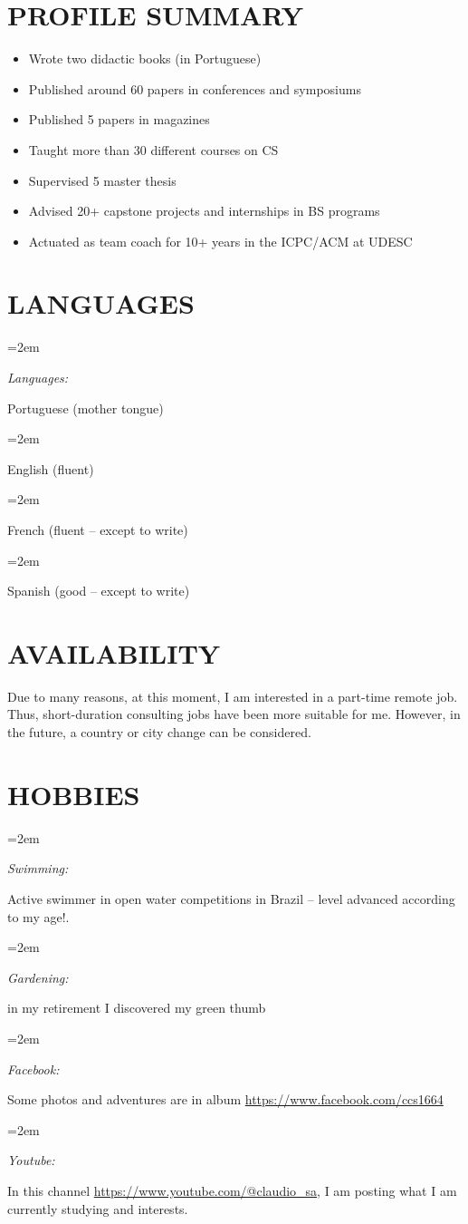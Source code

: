 \documentclass[paper=a4,fontsize=11pt]{scrartcl} %
\newlength{\spacebox}
\newcommand{\sepspace}{\vspace*{0.8em}}		%
\newcommand{\NewPart}[1]{\section*{\uppercase{#1}}}
\newcommand{\PersonalEntry}[2]{
		\noindent\hangindent=2em\hangafter=0 %
		\parbox{\spacebox}{        %
		\textit{#1}}		       %
		\hspace{1.5em} #2 \par}    %
\newcommand{\SkillsEntry}[2]{      %
		\noindent\hangindent=2em\hangafter=0 %
		\parbox{\spacebox}{        %
		\textit{#1}}			   %
		\hspace{1.5em} #2 \par}    %
\begin{document}
\NewPart{Profile Summary}{} %

\begin{itemize}
\setlength\itemsep{-2mm}
\item Wrote two didactic books  (in Portuguese)
\item Published around 60 papers in conferences and symposiums
\item Published 5 papers in magazines
\item Taught more than 30 different courses on CS 
\item Supervised 5 master thesis 
\item Advised  20+ capstone projects and internships in BS programs
\item Actuated as team coach for 10+ years in the ICPC/ACM at UDESC

\end{itemize}

\NewPart{Languages}{}

\SkillsEntry{Languages:} {Portuguese (mother tongue)}
\SkillsEntry{}{English (fluent)}
\SkillsEntry{}{French (fluent -- except to write)}
\SkillsEntry{}{Spanish (good -- except to write)}


\NewPart{Availability}{}

Due to many reasons, at this moment, I am interested in a part-time remote job. Thus,  short-duration consulting jobs  have been more suitable for me. However, in the future, a country or city change can be considered.

\NewPart{Hobbies}{}

\SkillsEntry{Swimming:}{Active swimmer in open water competitions in Brazil -- level advanced according to my age!.} 
\sepspace

\SkillsEntry{Gardening:}{in my retirement I discovered my green thumb}
\sepspace


\SkillsEntry{Facebook:} {Some photos and adventures are in album \url{https://www.facebook.com/ccs1664}}
\sepspace

\SkillsEntry{Youtube:} {In this channel \url{https://www.youtube.com/@claudio_sa},  I am posting what I am currently studying and interests.}
\end{document}
